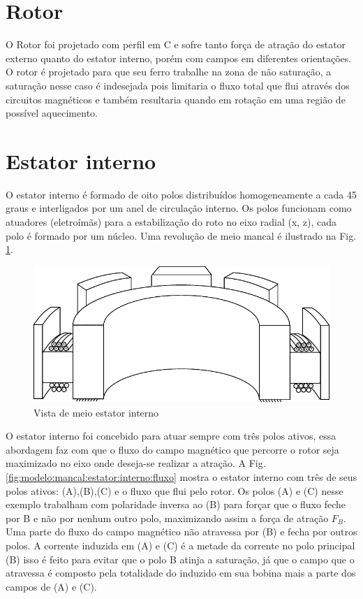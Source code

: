 
\section{Rotor}

O Rotor foi projetado com perfil em C e sofre tanto força de atração do estator externo quanto do estator interno, porém com campos em diferentes orientações. O rotor é projetado para que seu ferro trabalhe na zona de não saturação, a saturação nesse caso é indesejada pois limitaria o fluxo total que flui através dos circuitos magnéticos e também resultaria quando em rotação em uma região de possível aquecimento.

\section{Estator interno}

O estator interno é formado de oito polos distribuídos homogeneamente a cada 45 graus e interligados por um anel de circulação interno. Os polos funcionam como atuadores (eletroímãs) para a estabilização do roto no eixo radial (x, z),  cada polo é formado por um núcleo. Uma revolução de meio mancal é ilustrado na Fig. \ref{fig:modelo:mancal:estator:interno}. 

\begin{figure}[ht!]
	\centering
	\includegraphics[width=1\linewidth]{./Figs/modelo_mancal_estator_interno}
	\caption{Vista de meio estator interno}
	\label{fig:modelo:mancal:estator:interno}
\end{figure}

O estator interno foi concebido para atuar sempre com três polos ativos, essa abordagem faz com que o fluxo do campo magnético que percorre o rotor seja maximizado no eixo onde deseja-se realizar a atração. A Fig. \ref{fig:modelo:mancal:estator:interno:fluxo} mostra o estator interno com três de seus polos ativos: (A),(B),(C) e o fluxo que flui pelo rotor. Os polos (A) e (C) nesse exemplo trabalham com polaridade inversa ao (B) para forçar que o fluxo feche por B e não por nenhum outro polo, maximizando assim a força de atração $F_B$. Uma parte do fluxo do campo magnético não atravessa por (B) e fecha por outros polos. A corrente induzida em (A) e (C) é a metade da corrente no polo principal (B) isso é feito para evitar que o polo B atinja a saturação, já que o campo que o atravessa é composto pela totalidade do induzido em sua bobina mais a parte dos campos de (A) e (C).

